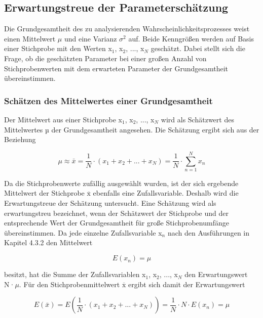 \subsection{Erwartungstreue der Parametersch\"{a}tzung}

\noindent Die Grundgesamtheit des zu analysierenden Wahrscheinlichkeitsprozesses weist einen Mittelwert $\mu$ und eine Varianz $\sigma^{2}$ auf. Beide Kenngr\"{o}{\ss}en werden auf Basis einer Stichprobe mit den Werten x$_{1}$, x$_{2}$, ..., x$_{N}$ gesch\"{a}tzt. Dabei stellt sich die Frage, ob die gesch\"{a}tzten Parameter bei einer gro{\ss}en Anzahl von Stichprobenwerten mit dem erwarteten Parameter der Grundgesamtheit \"{u}bereinstimmen.

\subsubsection{Sch\"{a}tzen des Mittelwertes einer Grundgesamtheit}

\noindent Der Mittelwert aus einer Stichprobe x${}_{1}$, x${}_{2}$, ..., x${}_{N}$ wird als Sch\"{a}tzwert des Mittelwertes µ der Grundgesamtheit angesehen. Die Sch\"{a}tzung ergibt sich aus der Beziehung

\begin{equation}\label{eq:fivethree}
\mu \approx \bar{x}=\dfrac{1}{N} \cdot \left(x_{1} +x_{2} +...+x_{N} \right)=\dfrac{1}{N} \cdot \sum _{n=1}^{N}x_{n}
\end{equation}

\noindent Da die Stichprobenwerte zuf\"{a}llig ausgew\"{a}hlt wurden, ist der sich ergebende Mittelwert der Stichprobe $\overline{\mathrm{x}}$ ebenfalls eine Zufallsvariable. Deshalb wird die Erwartungstreue der Sch\"{a}tzung untersucht. Eine Sch\"{a}tzung wird als erwartungstreu bezeichnet, wenn der Sch\"{a}tzwert der Stichprobe und der entsprechende Wert der Grundgesamtheit f\"{u}r gro{\ss}e Stichprobenumf\"{a}nge \"{u}bereinstimmen. Da jede einzelne Zufallsvariable x$_{n}$ nach den Ausf\"{u}hrungen in Kapitel 4.3.2 den Mittelwert

\begin{equation}\label{eq:fivefour}
E(x_{n})=\mu
\end{equation}

\noindent besitzt, hat die Summe der Zufallsvariablen x$_{1}$, x$_{2}$, ..., x$_{N}$ den Erwartungswert N·$\mu$. F\"{u}r den Stichprobenmittelwert $\overline{\mathrm{x}}$ ergibt sich damit der Erwartungswert 

\begin{equation}\label{eq:fivefive}
E(\bar{x})=E\left(\dfrac{1}{N} \cdot \left(x_{1} +x_{2} +...+x_{N} \right)\right)=\dfrac{1}{N} \cdot N\cdot E\left(x_{n} \right)=\mu
\end{equation}

